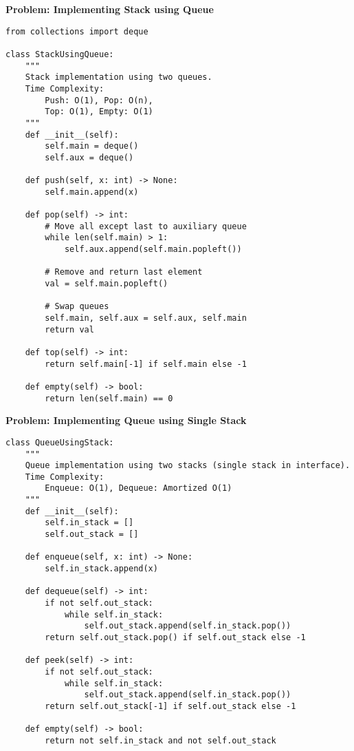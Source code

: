 \noindent\textbf{Problem: Implementing Stack using Queue}
\begin{verbatim}
from collections import deque

class StackUsingQueue:
    """
    Stack implementation using two queues.
    Time Complexity: 
        Push: O(1), Pop: O(n), 
        Top: O(1), Empty: O(1)
    """
    def __init__(self):
        self.main = deque()
        self.aux = deque()

    def push(self, x: int) -> None:
        self.main.append(x)

    def pop(self) -> int:
        # Move all except last to auxiliary queue
        while len(self.main) > 1:
            self.aux.append(self.main.popleft())
        
        # Remove and return last element
        val = self.main.popleft()
        
        # Swap queues
        self.main, self.aux = self.aux, self.main
        return val

    def top(self) -> int:
        return self.main[-1] if self.main else -1

    def empty(self) -> bool:
        return len(self.main) == 0
\end{verbatim}

\noindent\textbf{Problem: Implementing Queue using Single Stack}
\begin{verbatim}
class QueueUsingStack:
    """
    Queue implementation using two stacks (single stack in interface).
    Time Complexity: 
        Enqueue: O(1), Dequeue: Amortized O(1)
    """
    def __init__(self):
        self.in_stack = []
        self.out_stack = []

    def enqueue(self, x: int) -> None:
        self.in_stack.append(x)

    def dequeue(self) -> int:
        if not self.out_stack:
            while self.in_stack:
                self.out_stack.append(self.in_stack.pop())
        return self.out_stack.pop() if self.out_stack else -1

    def peek(self) -> int:
        if not self.out_stack:
            while self.in_stack:
                self.out_stack.append(self.in_stack.pop())
        return self.out_stack[-1] if self.out_stack else -1

    def empty(self) -> bool:
        return not self.in_stack and not self.out_stack
\end{verbatim}

